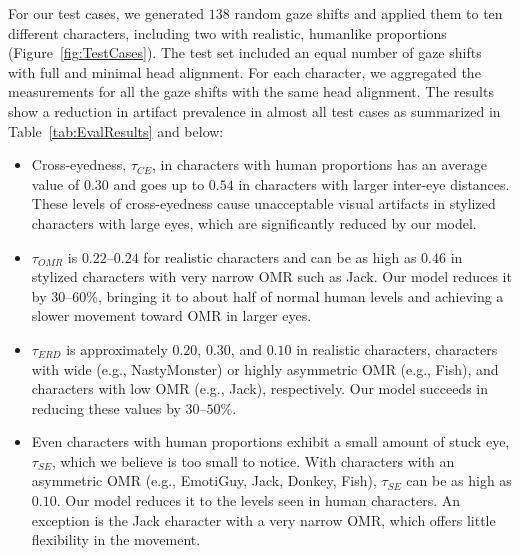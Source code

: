 For our test cases, we generated $138$ random gaze shifts and applied them to ten different characters, including two with realistic, humanlike proportions (Figure~\ref{fig:TestCases}). The test set included an equal number of gaze shifts with full and minimal head alignment. For each character, we aggregated the measurements for all the gaze shifts with the same head alignment. The results show a reduction in artifact prevalence in almost all test cases as summarized in Table~\ref{tab:EvalResults} and below:

\begin{itemize}
\item Cross-eyedness, $\tau_{CE}$, in characters with human proportions has an average value of $0.30$ and goes up to $0.54$ in characters with larger inter-eye distances. These levels of cross-eyedness cause unacceptable visual artifacts in stylized characters with large eyes, which are significantly reduced by our model.
\item $\tau_{OMR}$ is $0.22$--$0.24$ for realistic characters and can be as high as $0.46$ in stylized characters with very narrow OMR such as Jack. Our model reduces it by $30$--$60$\%, bringing it to about half of normal human levels and achieving a slower movement toward OMR in larger eyes.
\item $\tau_{ERD}$ is approximately $0.20$, $0.30$, and $0.10$ in realistic characters, characters with wide (e.g., NastyMonster) or highly asymmetric OMR (e.g., Fish), and characters with low OMR (e.g., Jack), respectively. Our model succeeds in reducing these values by $30$--$50$\%.
\item Even characters with human proportions exhibit a small amount of stuck eye, $\tau_{SE}$, which we believe is too small to notice. With characters with an asymmetric OMR (e.g., EmotiGuy, Jack, Donkey, Fish), $\tau_{SE}$ can be as high as $0.10$. Our model reduces it to the levels seen in human characters. An exception is the Jack character with a very narrow OMR, which offers little flexibility in the movement.
\end{itemize}
